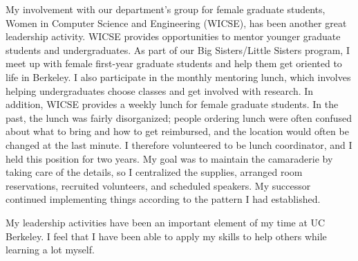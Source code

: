\documentclass{article}
\begin{document}
My involvement with our department's group for female graduate students, Women in Computer Science and Engineering (WICSE), has been another great leadership activity.
WICSE provides opportunities to mentor younger graduate students and undergraduates.
As part of our Big Sisters/Little Sisters program, I meet up with female first-year graduate students and help them get oriented to life in Berkeley.
I also participate in the monthly mentoring lunch, which involves helping undergraduates choose classes and get involved with research.
In addition, WICSE provides a weekly lunch for female graduate students.
In the past, the lunch was fairly disorganized; people ordering lunch were often confused about what to bring and how to get reimbursed, and the location would often be changed at the last minute.
I therefore volunteered to be lunch coordinator, and I held this position for two years.
My goal was to maintain the camaraderie by taking care of the details, so I centralized the supplies, arranged room reservations, recruited volunteers, and scheduled speakers.
My successor continued implementing things according to the pattern I had established.

My leadership activities have been an important element of my time at UC Berkeley.
I feel that I have been able to apply my skills to help others while learning a lot myself.
\end{document}
